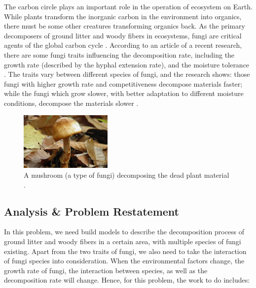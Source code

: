 \documentclass[a4paper,12pt]{article}
\begin{document}
\par The carbon circle plays an important role in the operation of ecosystem on Earth. While plants transform the inorganic carbon in the environment into organics, there must be some other creatures transforming organics back. As the primary decomposers of ground litter and woody fibers in ecosystems, fungi are critical agents of the global carbon cycle \cite{CompArticle}. According to an article of a recent research, there are some fungi traits influencing the decomposition rate, including the growth rate (described by the hyphal extension rate), and the moisture tolerance \cite{CompArticle}. The traits vary between different species of fungi, and the research shows: those fungi with higher growth rate and competitiveness decompose materials faster; while the fungi which grow slower, with better adaptation to different moisture conditions, decompose the materials slower \cite{CompArticle}. 

\begin{figure}[H]
	\centering
	\includegraphics[width=0.4\textwidth]{./figures/fungi.jpeg}
	\caption{A mushroom (a type of fungi) decomposing the dead plant material \cite{mushroom}.}
	\label{mushroom}
\end{figure}

\subsection{Analysis \& Problem Restatement}

\par In this problem, we need build models to describe the decomposition process of ground litter and woody fibers in a certain area, with multiple species of fungi existing. Apart from the two traits of fungi, we also need to take the interaction of fungi species into consideration. When the environmental factors change, the growth rate of fungi, the interaction between species, as well as the decomposition rate will change. Hence, for this problem, the work to do includes:
\end{document}

